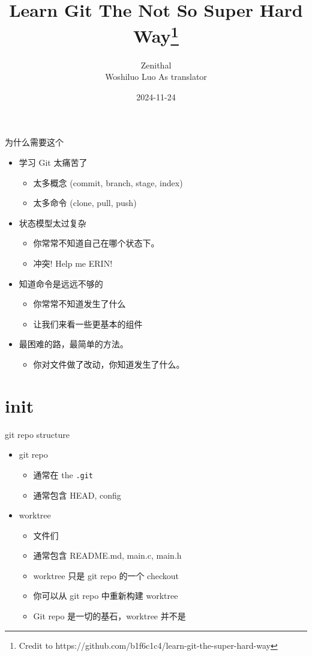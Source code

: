 \documentclass[aspectratio=169]{beamer}
\title[Learn Git]{Learn Git The Not So Super Hard Way\footnote{Credit to https://github.com/b1f6c1c4/learn-git-the-super-hard-way}}
\author[zenithal]{Zenithal \\ Woshiluo Luo As translator}
\date{2024-11-24}
\newcommand{\T}[1]{\texttt{#1}}
\begin{document}
\begin{frame}
\titlepage
\end{frame}

\begin{frame}{为什么需要这个}
  \begin{itemize}
    \item<1-> 学习 Git 太痛苦了\begin{itemize}
      \item 太多概念 (commit, branch, stage, index)
      \item 太多命令 (clone, pull, push)
    \end{itemize}
    \item<2-> 状态模型太过复杂\begin{itemize}
      \item 你常常不知道自己在哪个状态下。
      \item 冲突! Help me ERIN!
    \end{itemize}
    \item<3-> 知道命令是远远不够的\begin{itemize}
      \item 你常常不知道发生了什么
      \item 让我们来看一些更基本的组件
    \end{itemize}
    \item<4-> 最困难的路，最简单的方法。\begin{itemize}
      \item 你对文件做了改动，你知道发生了什么。
    \end{itemize}
  \end{itemize}
\end{frame}

\section{init}
\begin{frame}{git repo structure}
  \begin{itemize}
    \item git repo\begin{itemize}
      \item 通常在 the \T{.git}
      \item 通常包含 HEAD, config
    \end{itemize}
    \item worktree\begin{itemize}
      \item 文件们
      \item 通常包含 README.md, main.c, main.h
      \item worktree 只是 git repo 的一个 checkout
      \item 你可以从 git repo 中重新构建 worktree
      \item Git repo 是一切的基石，worktree 并不是
    \end{itemize}
  \end{itemize}
\end{frame}
\end{document}
